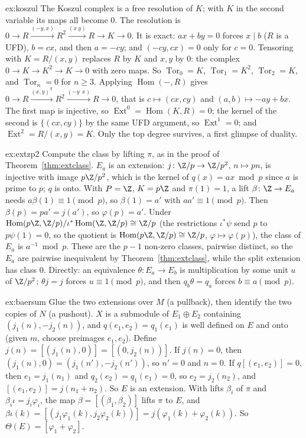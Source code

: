 \begin{solution}{ex:koszul}
\idea The Koszul complex is a free resolution of $K$; with $K$ in the second variable its maps all become $0$.
\writeup The resolution is $0\to R\xrightarrow{(-y,x)}R^2\xrightarrow{(x\ y)}R\to K\to0$. It is exact: $ax+by=0$ forces $x\mid b$ ($R$ is a UFD), $b=cx$, and then $a=-cy$; and $(-cy,cx)=0$ only for $c=0$. Tensoring with
$K=R/(x,y)$ replaces $R$ by $K$ and $x,y$ by $0$: the complex $0\to K\to K^2\to K\to0$ with zero maps. So $\operatorname{Tor}_0=K$, $\operatorname{Tor}_1=K^2$, $\operatorname{Tor}_2=K$, and $\operatorname{Tor}_n=0$ for $n\ge3$.
Applying $\operatorname{Hom}(-,R)$ gives $0\to R\xrightarrow{(x,y)^{\mathsf T}}R^2\xrightarrow{(-y\ \ x)}R\to0$, that is $c\mapsto(cx,cy)$ and $(a,b)\mapsto-ay+bx$. The first map is injective, so $\operatorname{Ext}^0=\operatorname{Hom}(K,R)=0$; the
kernel of the second is $\{(cx,cy)\}$ by the same UFD argument, so $\operatorname{Ext}^1=0$; and $\operatorname{Ext}^2=R/(x,y)=K$. Only the top degree survives, a first glimpse of duality.
\end{solution}

\begin{solution}{ex:extzp2}
\idea Compute the class by lifting $\pi$, as in the proof of Theorem~\ref{thm:extclass}.
\writeup $E_a$ is an extension: $j\colon\Z/p\to\Z/p^2$, $n\mapsto pn$, is injective with image $p\Z/p^2$, which is the kernel of $q(x)=ax\bmod p$ since $a$ is prime to $p$; $q$ is onto. With $P=\Z$, $K=p\Z$ and $\pi(1)=1$, a lift
$\beta\colon\Z\to E_a$ needs $a\beta(1)\equiv1\pmod p$, so $\beta(1)=a'$ with $aa'\equiv1\pmod p$. Then $\beta(p)=pa'=j(a')$, so $\varphi(p)=a'$. Under $\operatorname{Hom}(p\Z,\Z/p)/\iota^*\operatorname{Hom}(\Z,\Z/p)\cong\Z/p$
(the restrictions $\iota^*\psi$ send $p$ to $p\psi(1)=0$, so the quotient is $\operatorname{Hom}(p\Z,\Z/p)\cong\Z/p$, $\varphi\mapsto\varphi(p)$), the class of $E_a$ is $a^{-1}\bmod p$. These are the $p-1$ non-zero classes, pairwise distinct,
so the $E_a$ are pairwise inequivalent by Theorem~\ref{thm:extclass}, while the split extension has class $0$. Directly: an equivalence $\theta\colon E_a\to E_b$ is multiplication by some unit $u$ of $\Z/p^2$; $\theta j=j$ forces $u\equiv1\pmod p$,
and then $q_b\theta=q_a$ forces $b\equiv a\pmod p$.
\end{solution}

\begin{solution}{ex:baersum}
\idea Glue the two extensions over $M$ (a pullback), then identify the two copies of $N$ (a pushout).
\writeup $X$ is a submodule of $E_1\oplus E_2$ containing $(j_1(n),-j_2(n))$, and $q(e_1,e_2)=q_1(e_1)$ is well defined on $E$ and onto (given $m$, choose preimages $e_1,e_2$). Define $j(n)=[(j_1(n),0)]=[(0,j_2(n))]$. If $j(n)=0$, then
$(j_1(n),0)=(j_1(n'),-j_2(n'))$, so $n'=0$ and $n=0$. If $q[(e_1,e_2)]=0$, then $e_1=j_1(n_1)$ and $q_2(e_2)=q_1(e_1)=0$, so $e_2=j_2(n_2)$, and $[(e_1,e_2)]=j(n_1+n_2)$. So $E$ is an extension. With lifts $\beta_i$ of $\pi$ and
$\beta_i\iota=j_i\varphi_i$, the map $\beta=[(\beta_1,\beta_2)]$ lifts $\pi$ to $E$, and $\beta\iota(k)=[(j_1\varphi_1(k),j_2\varphi_2(k))]=j(\varphi_1(k)+\varphi_2(k))$. So $\Theta(E)=[\varphi_1+\varphi_2]$.
\end{solution}


